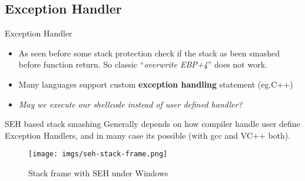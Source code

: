 \subsection{Exception Handler}
\begin{frame}{Exception Handler}

\begin{itemize}
\item As seen before some stack protection check if the stack as been smashed before function return. So classic ``\emph{overwrite EBP+4}'' does not work.
\item Many languages support custom {\bf exception handling} statement (eg.C++)
\item \emph{May we execute our shellcode instead of user defined handler?}
\end{itemize}

\begin{block}{SEH based stack smashing}
Generally depends on how compiler handle user define Exception Handlers, and in many case its possible (with gcc and VC++ both).\\
\end{block}

\framebreak
	\begin{figure}
        \texttt{[image: imgs/seh-stack-frame.png]}
        \label{fig:seh-stack-frame}
        \caption{Stack frame with SEH under Windows}
    \end{figure}	
   

\end{frame}

